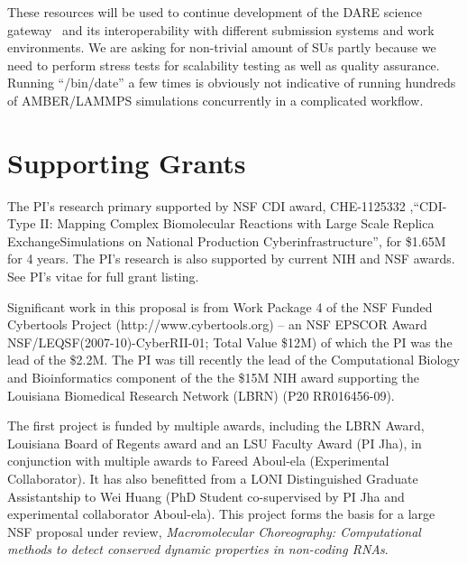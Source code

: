 \documentclass[a4paper,11pt]{article}
\begin{document}
These resources will be used to continue development of the DARE science gateway~\cite{dare-tg11} and its interoperability with different submission systems and work environments. We are asking for non-trivial amount of SUs partly because we need to perform stress tests for scalability testing as well as quality assurance. Running ``/bin/date'' a few times is obviously not indicative of running hundreds of AMBER/LAMMPS simulations concurrently in a complicated workflow.


\section{Supporting Grants}

The PI's research primary supported by NSF CDI award, CHE-1125332
,``CDI-Type II: Mapping Complex Biomolecular Reactions with Large
Scale Replica ExchangeSimulations on National Production
Cyberinfrastructure'', for \$1.65M for 4 years. The PI's research is
also supported by current NIH and NSF awards.  See PI's vitae for full
grant listing.

Significant work in this proposal is from Work Package 4 of the NSF Funded Cybertools Project (http://www.cybertools.org) -- an NSF EPSCOR Award NSF/LEQSF(2007-10)-CyberRII-01; Total Value \$12M) of which the PI was the lead of the \$2.2M. The PI was till recently the lead of the Computational Biology and Bioinformatics component of the the \$15M NIH award supporting the Louisiana Biomedical Research Network (LBRN) (P20 RR016456-09). %

The first project is funded by multiple awards, including the LBRN Award, Louisiana Board of Regents award and an LSU Faculty Award (PI Jha), in conjunction with multiple awards to Fareed Aboul-ela (Experimental Collaborator). It has also benefitted from a LONI Distinguished Graduate Assistantship to Wei Huang (PhD Student co-supervised by PI Jha and experimental collaborator Aboul-ela). This project forms the basis for a large NSF proposal under review, {\it Macromolecular Choreography: Computational methods to detect conserved dynamic properties in non-coding RNAs}.

 
\end{document}
